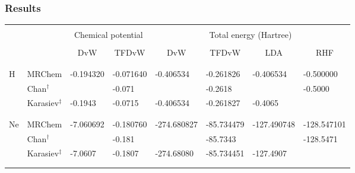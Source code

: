 \documentclass[mathserif, 8pt]{beamer}
\begin{document}
\begin{frame}
    \frametitle{Results}
\begin{table}
\footnotesize
\begin{center}
\begin{tabular}{ll|ll|llll}
\hline
\hline
	&		    &               &               &               &               &               &		    \\
	&		    &\multicolumn{2}{|c|}{Chemical potential}&\multicolumn{4}{|c}{Total energy (Hartree)}\\
	&		    &               &               &               &               &               &		    \\
	&		    &
\multicolumn{1}{|c}{DvW}&
\multicolumn{1}{c|}{TFDvW}&
\multicolumn{1}{c}{DvW}&
\multicolumn{1}{c}{TFDvW}&
\multicolumn{1}{c}{LDA}&
\multicolumn{1}{c}{RHF}\\
	&		    &               &               &               &               &               &		    \\
\hline                                                      
	&		    &               &               &               &               &               &		    \\
H	& MRChem	    &  -0.194320    &  -0.071640    &   -0.406534   &  -0.261826    &   -0.406534   &   -0.500000   \\
	& Chan$^\dag$	    &		    &  -0.071	    &		    &  -0.2618      &		    &   -0.5000     \\
        & Karasiev$^\ddag$  &  -0.1943      &  -0.0715      &   -0.406534   &  -0.261827    &   -0.4065     &		    \\
	&		    &               &               &               &               &               &		    \\
	&		    &               &               &               &               &               &		    \\
Ne	& MRChem	    &  -7.060692    &  -0.180760    & -274.680827   & -85.734479    & -127.490748   & -128.547101   \\
	& Chan$^\dag$	    &		    &  -0.181       &		    & -85.7343      &		    & -128.5471     \\
	& Karasiev$^\ddag$  &  -7.0607	    &  -0.1807      & -274.68080    & -85.734451    & -127.4907	    &		    \\
	&		    &               &               &               &               &               &		    \\
	&		    &               &               &               &               &               &		    \\

\end{tabular}
\end{center}
\end{table}
\end{frame}
\end{document}

